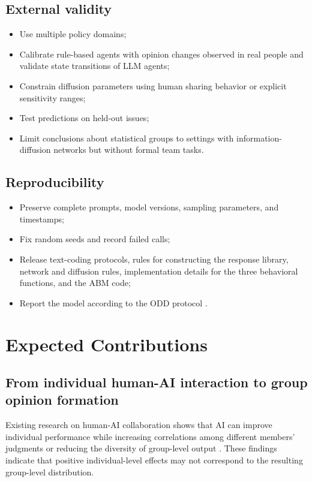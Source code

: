 \documentclass[11pt,a4paper]{article}
\begin{document}
\subsection{External validity}

\begin{itemize}
\item Use multiple policy domains;
\item Calibrate rule-based agents with opinion changes observed in real people and validate state transitions of LLM agents;
\item Constrain diffusion parameters using human sharing behavior or explicit sensitivity ranges;
\item Test predictions on held-out issues;
\item Limit conclusions about statistical groups to settings with information-diffusion networks but without formal team tasks.
\end{itemize}

\subsection{Reproducibility}

\begin{itemize}
\item Preserve complete prompts, model versions, sampling parameters, and timestamps;
\item Fix random seeds and record failed calls;
\item Release text-coding protocols, rules for constructing the response library, network and diffusion rules, implementation details for the three behavioral functions, and the ABM code;
\item Report the model according to the ODD protocol \cite{grimm2020}.
\end{itemize}

\section{Expected Contributions}

\subsection{From individual human-AI interaction to group opinion formation}

Existing research on human-AI collaboration shows that AI can improve individual performance while increasing correlations among different members' judgments or reducing the diversity of group-level output \cite{fugener2021,doshi2024}. These findings indicate that positive individual-level effects may not correspond to the resulting group-level distribution.
\end{document}
